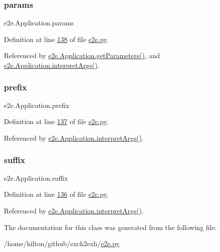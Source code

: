 \subsubsection{\texorpdfstring{params}{params}}
{\footnotesize\ttfamily e2e.\+Application.\+params}



Definition at line \hyperlink{e2e_8py_source_l00138}{138} of file \hyperlink{e2e_8py_source}{e2e.\+py}.



Referenced by \hyperlink{e2e_8py_source_l00386}{e2e.\+Application.\+get\+Parameters()}, and \hyperlink{e2e_8py_source_l00183}{e2e.\+Application.\+interpret\+Args()}.

\mbox{\label{classe2e_1_1_application_a027ff25e5409ae17584978a09fc2611a}} 
\subsubsection{\texorpdfstring{prefix}{prefix}}
{\footnotesize\ttfamily e2e.\+Application.\+prefix}



Definition at line \hyperlink{e2e_8py_source_l00137}{137} of file \hyperlink{e2e_8py_source}{e2e.\+py}.



Referenced by \hyperlink{e2e_8py_source_l00183}{e2e.\+Application.\+interpret\+Args()}.

\mbox{\label{classe2e_1_1_application_a4d824ad36b051d2d629edb314385df0d}} 
\subsubsection{\texorpdfstring{suffix}{suffix}}
{\footnotesize\ttfamily e2e.\+Application.\+suffix}



Definition at line \hyperlink{e2e_8py_source_l00136}{136} of file \hyperlink{e2e_8py_source}{e2e.\+py}.



Referenced by \hyperlink{e2e_8py_source_l00183}{e2e.\+Application.\+interpret\+Args()}.



The documentation for this class was generated from the following file\+:\begin{DoxyCompactItemize}
\item 
/home/hilton/github/exch2exh/\hyperlink{e2e_8py}{e2e.\+py}\end{DoxyCompactItemize}
